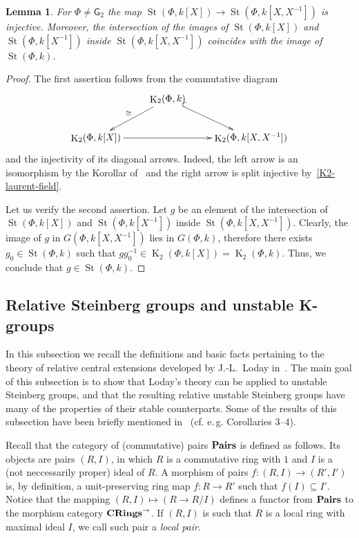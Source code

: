 \documentclass[oneside, 8pt]{amsart}
\newtheorem{lemma}{Lemma}
\theoremstyle{remark}
\theoremstyle{definition}
\numberwithin{lemma}{section}
\numberwithin{prop}{section}
\numberwithin{corollary}{section}
\numberwithin{externaltheorem}{section}
\DeclareMathOperator{\St}{St}
\DeclareMathOperator{\K}{K}
\newcommand{\inv}{^{-1}}
\newcommand{\catname}[1]{{\normalfont\textbf{#1}}} %
\newcommand{\rG}{\mathsf{G}}
\numberwithin{equation}{section}
\begin{document}
\begin{lemma} \label{field-injectivity} For $\Phi\neq\rG_2$ the map $\St(\Phi, k[X]) \to \St(\Phi, k[X, X^{-1}])$ is injective. Moreover, the intersection of the images of $\St(\Phi, k[X])$ and $\St(\Phi, k[X\inv])$ inside $\St(\Phi, k[X, X\inv])$ coincides with the image of $\St(\Phi, k)$. \end{lemma}
\begin{proof} The first assertion follows from the commutative diagram
\[\xymatrix{ & \K_2(\Phi, k) \ar[dl]_{\cong} \ar@{^{(}->}[dr] & \\
               \K_2(\Phi, k[X]) \ar[rr] &               & \K_2(\Phi, k[X, X^{-1}])} \]
and the injectivity of its diagonal arrows. Indeed, the left arrow is an isomorphism by the Korollar of~\cite[Satz~1]{Re75} and the right arrow is split injective by~\cref{K2-laurent-field}.

Let us verify the second assertion. Let $g$ be an element of the intersection of $\St(\Phi, k[X])$ and $\St(\Phi, k[X\inv])$ inside $\St(\Phi, k[X, X\inv])$.
Clearly, the image of $g$ in $G(\Phi, k[X, X\inv])$ lies in $G(\Phi, k)$, therefore there exists $g_0 \in \St(\Phi, k)$ such that $gg_0^{-1} \in \K_2(\Phi, k[X]) = \K_2(\Phi, k)$. Thus, we conclude that $g \in \St(\Phi, k)$.
\end{proof}

\subsection{Relative Steinberg groups and unstable K-groups} \label{sec:quillen}
In this subsection we recall the definitions and basic facts pertaining to the theory of relative central extensions developed by J.-L.~Loday in~\cite{Lo78}. The main goal of this subsection is to show that Loday's theory can be applied to unstable Steinberg groups, and that the resulting relative unstable Steinberg groups have many of the properties of their stable counterparts. Some of the results of this subsection have been briefly mentioned in~\cite{S15} (cf. e.\,g. Corollaries 3--4).

Recall that the category of (commutative) pairs $\catname{Pairs}$ is defined as follows. Its objects are pairs $(R, I)$, in which $R$ is a commutative ring with $1$ and $I$ is a (not neccessarily proper) ideal of $R$. A morphism of pairs $f \colon (R, I) \to (R', I')$ is, by definition, a unit-preserving ring map $f \colon R \to R'$ such that $f(I) \subseteq I'$. Notice that the mapping $(R, I) \mapsto (R \to R/I)$ defines a functor from $\catname{Pairs}$ to the morphism category $\catname{CRings}^\rightarrow$.
If $(R, I)$ is such that $R$ is a local ring with maximal ideal $I$, we call such pair a {\it local pair}.
\end{document}
